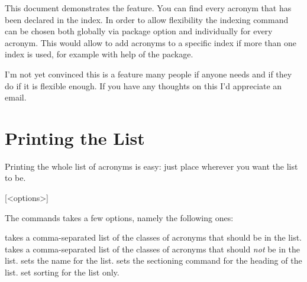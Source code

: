 \documentclass[DIV10,toc=index,toc=bib,hyperfootnotes=false]{cnpkgdoc}
\begin{document}
This document demonstrates the feature. You can find every acronym that has been
declared in the index. In order to allow flexibility the indexing command can be
chosen both globally via package option and individually for every acronym. This
would allow to add acronyms to a specific index if more than one index is used,
for example with help of the  package.

I'm not yet convinced this is a feature many people if anyone needs and if they
do if it is flexible enough. If you have any thoughts on this I'd appreciate an
email.

\section{Printing the List}\label{sec:print_lists}
\noindent{}Printing the whole list of acronyms is easy: just
place  wherever you want the list to be.
\begin{beschreibung}
 [<options>]
\end{beschreibung}
The commands takes a few options, namely the following ones:
\begin{beschreibung}
 \newline
   takes a comma-separated list of the classes of acronyms that should be in the
   list.
 \newline
   takes a comma-separated list of the classes of acronyms that should \emph{not}
   be in the list.
 \newline
   sets the name for the list.
   sets the sectioning command for the heading of the list.
   set sorting for the list only.
\end{beschreibung}
\begin{beispiel}
 \printacronyms[exclude-classes=city]

 \printacronyms[include-classes=city,name={City Acronyms}]
\end{beispiel}
\printacronyms[exclude-classes=city]

\printacronyms[include-classes=city,name={City Acronyms}]
\end{document}
